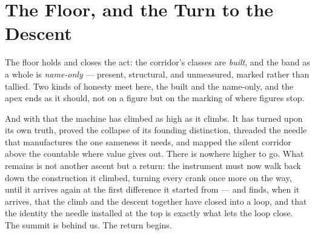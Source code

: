 \section{The Floor, and the Turn to the Descent}

The floor holds and closes the act: the corridor's classes are \emph{built}, and the band as a whole is
\emph{name-only} --- present, structural, and unmeasured, marked rather than tallied. Two kinds of honesty meet
here, the built and the name-only, and the apex ends as it should, not on a figure but on the marking of where
figures stop.

And with that the machine has climbed as high as it climbs. It has turned upon its own truth, proved the collapse
of its founding distinction, threaded the needle that manufactures the one sameness it needs, and mapped the
silent corridor above the countable where value gives out. There is nowhere higher to go. What remains is not
another ascent but a return: the instrument must now walk back down the construction it climbed, turning every
crank once more on the way, until it arrives again at the first difference it started from --- and finds, when it
arrives, that the climb and the descent together have closed into a loop, and that the identity the needle
installed at the top is exactly what lets the loop close. The summit is behind us. The return begins.

